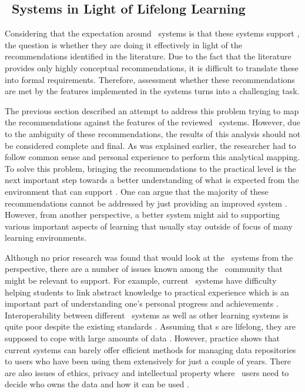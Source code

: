 \subsection{\ep~Systems in Light of Lifelong Learning}

Considering that the expectation around \ep~systems is that these systems
support \LLLsn, the question is whether they are doing it effectively in light
of the recommendations identified in the literature. Due to the fact that the
literature provides only highly conceptual recommendations, it is difficult to
translate these into formal requirements. Therefore, assessment whether these
recommendations are met by the features implemented in the systems turns into a
challenging task. 

The previous section described an attempt to address this problem trying to map
the recommendations against the features of the reviewed \ep~systems. However,
due to the ambiguity of these recommendations, the results of this analysis
should not be considered complete and final. As was explained earlier, the
researcher had to follow common sense and personal experience to perform this
analytical mapping. To solve this problem, bringing the recommendations to the
practical level is the next important step towards a better understanding of
what is expected from the environment that can support \LLLsn. One can argue
that the majority of these recommendations cannot be addressed by just providing
an improved system \citep{Schaffert2008}. However, from another perspective, a
better system might aid to supporting various important aspects of learning that
usually stay outside of focus of many learning environments.

Although no prior research was found that would look at the \ep~systems from the
\LLLs perspective, there are a number of issues known among the \ep~community
that might be relevant to \LLLs support. For example, current \ep~systems have
difficulty helping students to link abstract knowledge to practical experience
which is an important part of understanding one's personal progress and
achievements \citep{Chou2009}. Interoperability between different \ep~systems as
well as other learning systems is quite poor despite the existing standards
\citep{Clark2011}. Assuming that \ep s are lifelong, they are supposed to cope
with large amounts of data \citep{Butler2010}. However, practice shows that
current systems can barely offer efficient methods for managing data
repositories to users who have been using them extensively for just a couple of
years. There are also issues of ethics, privacy and intellectual property where
\ep~users need to decide who owns the data and how it can be used
\citep{Challis2005}.

